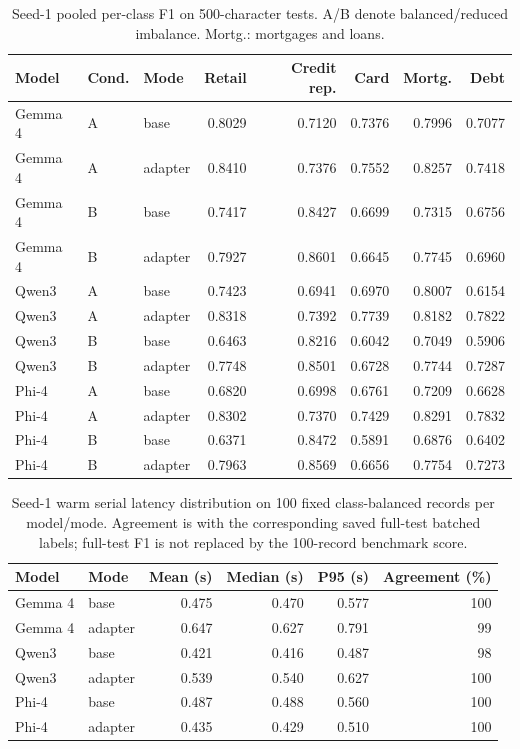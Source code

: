 \begin{table}[tb]
\centering
\footnotesize
\setlength{\tabcolsep}{3pt}
\caption{Seed-1 pooled per-class F1 on 500-character tests. A/B denote balanced/reduced imbalance. Mortg.: mortgages and loans.}
\label{tab:qlora_class}
\begin{tabular}{lllrrrrr}
\toprule
Model & Cond. & Mode & Retail & Credit rep. & Card & Mortg. & Debt \\
\midrule
Gemma 4 & A & base & 0.8029 & 0.7120 & 0.7376 & 0.7996 & 0.7077 \\
Gemma 4 & A & adapter & 0.8410 & 0.7376 & 0.7552 & 0.8257 & 0.7418 \\
Gemma 4 & B & base & 0.7417 & 0.8427 & 0.6699 & 0.7315 & 0.6756 \\
Gemma 4 & B & adapter & 0.7927 & 0.8601 & 0.6645 & 0.7745 & 0.6960 \\
Qwen3 & A & base & 0.7423 & 0.6941 & 0.6970 & 0.8007 & 0.6154 \\
Qwen3 & A & adapter & 0.8318 & 0.7392 & 0.7739 & 0.8182 & 0.7822 \\
Qwen3 & B & base & 0.6463 & 0.8216 & 0.6042 & 0.7049 & 0.5906 \\
Qwen3 & B & adapter & 0.7748 & 0.8501 & 0.6728 & 0.7744 & 0.7287 \\
Phi-4 & A & base & 0.6820 & 0.6998 & 0.6761 & 0.7209 & 0.6628 \\
Phi-4 & A & adapter & 0.8302 & 0.7370 & 0.7429 & 0.8291 & 0.7832 \\
Phi-4 & B & base & 0.6371 & 0.8472 & 0.5891 & 0.6876 & 0.6402 \\
Phi-4 & B & adapter & 0.7963 & 0.8569 & 0.6656 & 0.7754 & 0.7273 \\
\bottomrule
\end{tabular}
\end{table}
\begin{table}[tb]
\centering
\footnotesize
\setlength{\tabcolsep}{3pt}
\caption{Seed-1 warm serial latency distribution on 100 fixed class-balanced records per model/mode. Agreement is with the corresponding saved full-test batched labels; full-test F1 is not replaced by the 100-record benchmark score.}
\label{tab:qlora_serial}
\begin{tabular}{llrrrr}
\toprule
Model & Mode & Mean (s) & Median (s) & P95 (s) & Agreement (\%) \\
\midrule
Gemma 4 & base & 0.475 & 0.470 & 0.577 & 100 \\
Gemma 4 & adapter & 0.647 & 0.627 & 0.791 & 99 \\
Qwen3 & base & 0.421 & 0.416 & 0.487 & 98 \\
Qwen3 & adapter & 0.539 & 0.540 & 0.627 & 100 \\
Phi-4 & base & 0.487 & 0.488 & 0.560 & 100 \\
Phi-4 & adapter & 0.435 & 0.429 & 0.510 & 100 \\
\bottomrule
\end{tabular}
\end{table}
